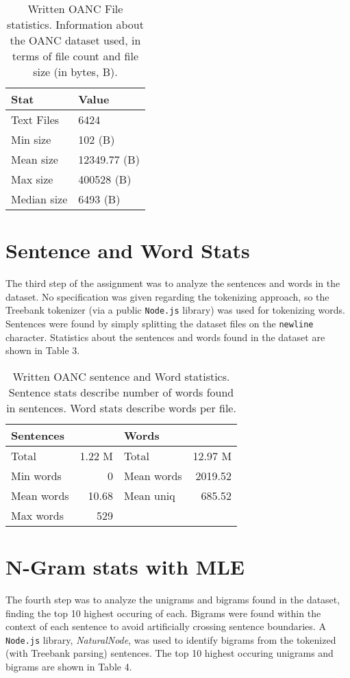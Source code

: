 \documentclass[11pt]{article}
\begin{document}
\begin{table}[h]
\begin{center}
\begin{tabular}{|l|l|}
\hline \bf Stat & \bf Value \\ \hline
Text Files & 6424 \\
Min size & 102 (B) \\
Mean size & 12349.77 (B) \\
Max size & 400528 (B) \\
Median size & 6493 (B) \\
\hline
\end{tabular}
\end{center}
\caption{\label{fileStats} Written OANC File statistics. Information about the OANC dataset used,
in terms of file count and file size (in bytes, B).}
\end{table}

\section{Sentence and Word Stats}
The third step of the assignment was to analyze the sentences and words in the dataset. No
specification was given regarding the tokenizing approach, so the Treebank tokenizer (via a
public {\tt Node.js} library) was used for tokenizing words.  Sentences were found by simply
splitting the dataset files on the {\tt newline} character.
Statistics about the sentences and words found in the dataset are shown in Table 3.

\begin{table}[h]
\begin{center}
\begin{tabular}{|lr|lr|}
\hline \bf Sentences & & \bf Words & \\ \hline
Total & 1.22 M & Total & 12.97 M \\
Min words & 0 & Mean words & 2019.52 \\
Mean words & 10.68 & Mean uniq & 685.52 \\
Max words & 529 & & \\
\hline
\end{tabular}
\end{center}
\caption{\label{tokenStats} Written OANC sentence and Word statistics.
Sentence stats describe number of words found in sentences. Word stats describe
words per file.}
\end{table}

\section{N-Gram stats with MLE}
The fourth step was to analyze the unigrams and bigrams found in the dataset,
finding the top 10 highest occuring of each.  Bigrams were found within the
context of each sentence to avoid artificially crossing sentence boundaries.
A {\tt Node.js} library, {\em NaturalNode}, was used to identify bigrams from
the tokenized (with Treebank parsing) sentences. The top 10 highest occuring
unigrams and bigrams are shown in Table 4.
\end{document}
